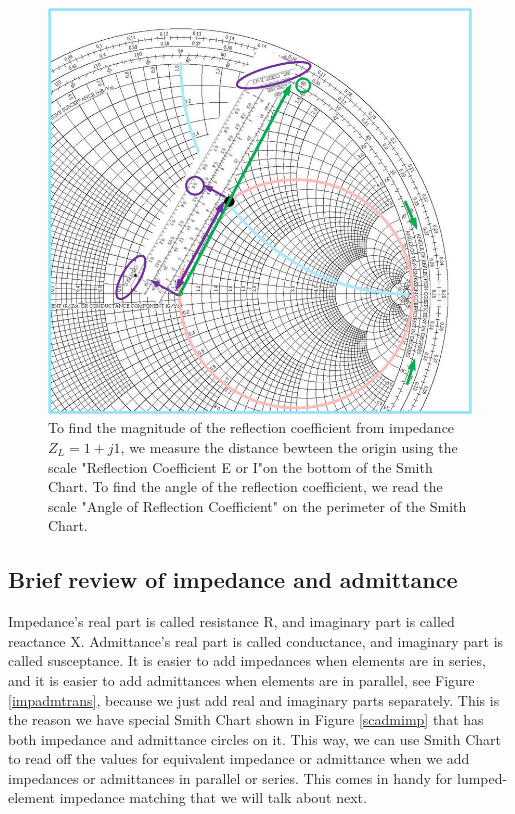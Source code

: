 \documentclass{ximera}
\begin{document}
\begin{figure}[htbp]
\begin{center}
\includegraphics[scale=0.3]{../jpg/FindingGammaFromImpedanceonSC.jpg}
\end{center}
\caption{To find the magnitude of the reflection coefficient from impedance $Z_L=1+j 1$, we measure the distance bewteen the origin using the scale "Reflection Coefficient E or I"on the bottom of the Smith Chart. To find the angle of the reflection coefficient, we read the scale "Angle of Reflection Coefficient" on the perimeter of the Smith Chart.}
\label{scgammafromZ}
\end{figure}

\newpage

\subsection*{Brief review of impedance and admittance}

Impedance's real part is called resistance R, and imaginary part is called reactance X. Admittance's real part is called conductance, and imaginary part is called susceptance. It is easier to add impedances when elements are in series, and it is easier to add admittances when elements are in parallel, see Figure \ref{impadmtrans}, because we just add real and imaginary parts separately. This is the reason we have special Smith Chart shown in Figure \ref{scadmimp} that has both impedance and admittance circles on it.  This way, we can use Smith Chart to read off the values for equivalent impedance or admittance when we add impedances or admittances in parallel or series. This comes in handy for lumped-element impedance matching that we will talk about next.
\end{document}
